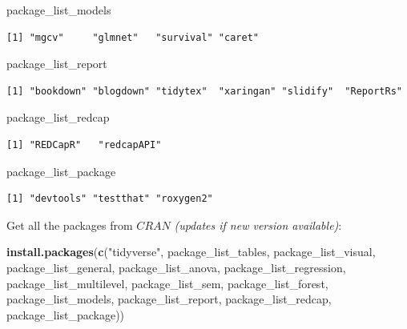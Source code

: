 \documentclass[]{book}
\newenvironment{Shaded}{\begin{snugshade}}{\end{snugshade}}
\newcommand{\KeywordTok}[1]{\textcolor[rgb]{0.13,0.29,0.53}{\textbf{#1}}}
\newcommand{\StringTok}[1]{\textcolor[rgb]{0.31,0.60,0.02}{#1}}
\newcommand{\NormalTok}[1]{#1}
\theoremstyle{definition}
\theoremstyle{definition}
\theoremstyle{definition}
\theoremstyle{remark}
\begin{document}
\begin{Shaded}
\begin{Highlighting}[]
\NormalTok{package_list_models}
\end{Highlighting}
\end{Shaded}

\begin{verbatim}
[1] "mgcv"     "glmnet"   "survival" "caret"   
\end{verbatim}

\begin{Shaded}
\begin{Highlighting}[]
\NormalTok{package_list_report}
\end{Highlighting}
\end{Shaded}

\begin{verbatim}
[1] "bookdown" "blogdown" "tidytex"  "xaringan" "slidify"  "ReportRs"
\end{verbatim}

\begin{Shaded}
\begin{Highlighting}[]
\NormalTok{package_list_redcap}
\end{Highlighting}
\end{Shaded}

\begin{verbatim}
[1] "REDCapR"   "redcapAPI"
\end{verbatim}

\begin{Shaded}
\begin{Highlighting}[]
\NormalTok{package_list_package}
\end{Highlighting}
\end{Shaded}

\begin{verbatim}
[1] "devtools" "testthat" "roxygen2"
\end{verbatim}

Get all the packages from \(CRAN\) \emph{(updates if new version
available)}:

\begin{Shaded}
\begin{Highlighting}[]
\KeywordTok{install.packages}\NormalTok{(}\KeywordTok{c}\NormalTok{(}\StringTok{"tidyverse"}\NormalTok{,}
\NormalTok{                   package_list_tables,}
\NormalTok{                   package_list_visual,}
\NormalTok{                   package_list_general,}
\NormalTok{                   package_list_anova,}
\NormalTok{                   package_list_regression,}
\NormalTok{                   package_list_multilevel,}
\NormalTok{                   package_list_sem,}
\NormalTok{                   package_list_forest,}
\NormalTok{                   package_list_models,}
\NormalTok{                   package_list_report,}
\NormalTok{                   package_list_redcap,}
\NormalTok{                   package_list_package))}
\end{Highlighting}
\end{Shaded}
\end{document}
